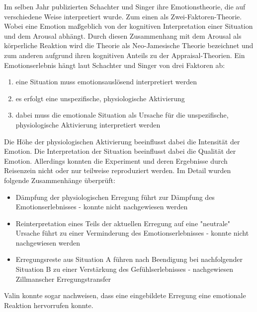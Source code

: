 Im selben Jahr publizierten Schachter und Singer ihre Emotionstheorie, die auf verschiedene Weise interpretiert wurde. Zum einen als Zwei-Faktoren-Theorie. Wobei eine Emotion maßgeblich von der kognitiven Interpretation einer Situation und dem Arousal abhängt. Durch diesen Zusammenhang mit dem Arousal als körperliche Reaktion wird die Theorie als Neo-Jamesische Theorie bezeichnet und zum anderen aufgrund ihren kognitiven Anteils zu der Appraisal-Theorien. Ein Emotionserlebnis hängt laut Schachter und Singer von drei Faktoren ab:

\begin{enumerate}
\item eine Situation muss emotionsauslösend interpretiert werden
\item es erfolgt eine unspezifische, physiologische Aktivierung
\item dabei muss die emotionale Situation als Ursache für die unspezifische, physiologische Aktivierung interpretiert werden
\end{enumerate}

Die Höhe der physiologischen Aktivierung beeinflusst dabei die Intensität der Emotion. Die Interpretation der Situation beeinflusst dabei die Qualität der Emotion. Allerdings konnten die Experiment und deren Ergebnisse durch Reisenzein nicht oder nur teilweise reproduziert werden. Im Detail wurden folgende Zusammenhänge überprüft:
\begin{itemize}
\item Dämpfung der physiologischen Erregung führt zur Dämpfung des Emotionserlebnisses - konnte nicht nachgewiesen werden

\item Reinterpretation eines Teils der aktuellen Erregung auf eine "neutrale" Ursache führt zu einer Verminderung des Emotionserlebnisses - konnte nicht nachgewiesen werden

\item Erregungsreste aus Situation A führen nach Beendigung bei nachfolgender Situation B zu einer Verstärkung des Gefühlserlebnisses - nachgewiesen Zillmanscher Erregungstransfer
\end{itemize}

Valin konnte sogar nachweisen, dass eine eingebildete Erregung eine emotionale Reaktion hervorrufen konnte. \\










